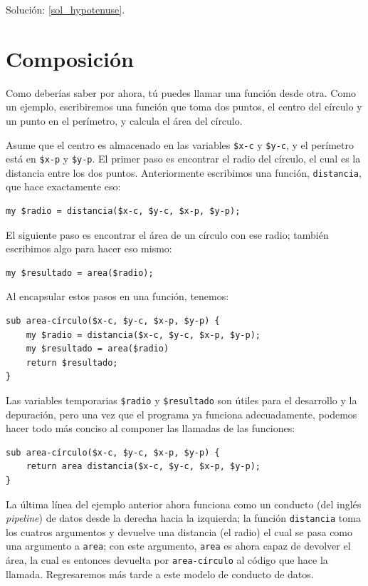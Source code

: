 Solución: \ref{sol_hypotenuse}.



\section{Composición}

Como deberías saber por ahora, tú puedes llamar una función
desde otra. Como un ejemplo, escribiremos una función 
que toma dos puntos, el centro del círculo y un punto en el 
perímetro, y calcula el área del círculo.

Asume que el centro es almacenado en las variables {\tt \$x-c} y
{\tt \$y-c}, y el perímetro está en {\tt \$x-p} y {\tt \$y-p}. 
El primer paso es encontrar el radio del círculo, el cual es la 
distancia entre los dos puntos. Anteriormente escribimos una función,
{\tt distancia}, que hace exactamente eso:

\begin{lstlisting}
my $radio = distancia($x-c, $y-c, $x-p, $y-p);
\end{lstlisting}
%
El siguiente paso es encontrar el área de un círculo 
con ese radio; también escribimos algo para hacer eso mismo:

\begin{lstlisting}
my $resultado = area($radio);
\end{lstlisting}
%
Al encapsular estos pasos en una función, tenemos:

\begin{lstlisting}
sub area-círculo($x-c, $y-c, $x-p, $y-p) {
    my $radio = distancia($x-c, $y-c, $x-p, $y-p);
    my $resultado = area($radio)
    return $resultado;
}
\end{lstlisting}
%
Las variables temporarias {\tt \$radio} y {\tt \$resultado} son útiles
para el desarrollo y la depuración, pero una vez que el programa ya funciona
adecuadamente, podemos hacer todo más conciso al componer las llamadas
de las funciones:

\begin{lstlisting}
sub area-círculo($x-c, $y-c, $x-p, $y-p) {
    return area distancia($x-c, $y-c, $x-p, $y-p);
}
\end{lstlisting}
%

La última línea del ejemplo anterior ahora funciona como
un conducto (del inglés \emph{pipeline}) de datos desde la 
derecha hacia la izquierda; la función \verb|distancia| toma 
los cuatros argumentos y devuelve una distancia (el radio)
el cual se pasa como una argumento a \verb|area|; con este
argumento, \verb|area| es ahora capaz de devolver el área,
la cual es entonces devuelta por \verb|area-círculo| al
código que hace la llamada. Regresaremos más tarde a este modelo
de conducto de datos.

